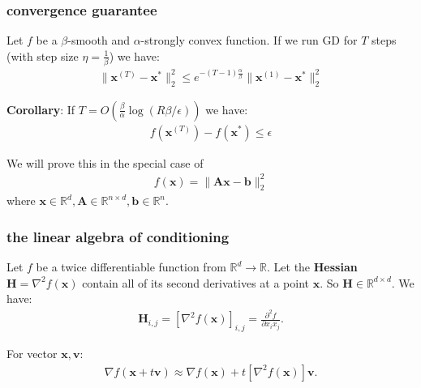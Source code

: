 \documentclass[compress]{beamer}
\newcommand{\bv}[1]{\mathbf{#1}}
\newcommand{\R}{\mathbb{R}}
\begin{document}
\begin{frame}[t]
	\frametitle{convergence guarantee}
	\begin{theorem}
	Let $f$ be a $\beta$-smooth and $\alpha$-strongly convex function. If we run GD for $T$ steps (with step size $\eta = \frac{1}{\beta}$) we have:
	\begin{align*}
		\|\bv{x}^{(T)} - \bv{x}^*\|_2^2 \leq e^{-(T-1)\frac{\alpha}{\beta}} \|\bv{x}^{(1)} - \bv{x}^*\|_2^2
	\end{align*} 
	\end{theorem}		
	
	\textbf{Corollary}: 
	If \alert{$T = O\left(\frac{\beta}{\alpha}\log(R\beta/\epsilon)\right)$} we have:
	\begin{align*}
		f({\bv{x}}^{(T)}) - f(\bv{x}^*) \leq \epsilon
	\end{align*}

We will prove this in the special case of 
\begin{align*}
	f(\bv{x}) = \|\bv{A}\bv{x} - \bv{b}\|_2^2
\end{align*}
where $\bv{x}\in \R^d, \bv{A}\in \R^{n\times d}, \bv{b}\in \R^n$. 
	
\end{frame}

\begin{frame}[t]
	\frametitle{the linear algebra of conditioning}
	Let $f$ be a twice differentiable function from $\R^d \rightarrow \R$. Let the \textbf{\alert{Hessian}} $\bv{H} = \nabla^2 f(\bv{x})$ contain all of its second derivatives at a point $\bv{x}$. So $\bv{H}\in \R^{d\times d}$.  We have:
	\begin{align*}
		\bv{H}_{i,j} = \left[\nabla^2 f(\bv{x})\right]_{i,j} = \frac{\partial^2 f}{\partial x_i x_j}. 
	\end{align*}
	
	For vector $\bv{x}, \bv{v}$:
	\begin{align*}
		\nabla f(\bv{x} + t\bv{v}) \approx \nabla f(\bv{x}) + t\left[\nabla^2 f(\bv{x})\right]\bv{v}.
	\end{align*}
\end{frame}
\end{document}
